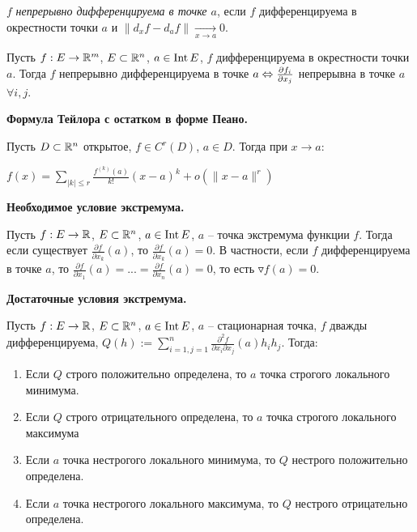 \documentclass[10pt, oneside, dvipsnames]{extarticle}
\begin{document}
\begin{definition}
    $f$ \textit{непрерывно дифференцируема в точке $a$}, если $f$ дифференцируема в окрестности точки $a$ и $\|d_xf-d_af\|\underset{x\rightarrow a}{\rightarrow} 0$.
\end{definition}

\begin{theorem}
    Пусть $f: E\rightarrow \mathbb{R}^m$, $E\subset \mathbb{R}^n$, $a\in \operatorname{Int} E$, $f$ дифференцируема в окрестности точки $a$. Тогда $f$ непрерывно дифференцируема в точке $a\Leftrightarrow\pdv{f_i}{x_j}$ непрерывна в точке $a$ $\forall i, j$. 
\end{theorem}


\begin{theorem}
    \textbf{Формула Тейлора с остатком в форме Пеано.}

    Пусть $D\subset \mathbb{R}^n$ открытое, $f\in C^{r}(D)$, $a\in D$. Тогда при $x\rightarrow a$:
    
    $f(x)=\sum\limits_{|k|\leq r}\frac{f^{(k)}(a)}{k!}(x-a)^k+o(\|x-a\|^r)$
\end{theorem}

\begin{theorem}
    \textbf{Необходимое условие экстремума.}

    Пусть $f: E\rightarrow \mathbb{R}$, $E\subset \mathbb{R}^n$, $a\in \operatorname{Int} E$, $a$ – точка экстремума функции $f$. Тогда если существует $\frac{\partial f}{\partial x_k}(a)$, то $\frac{\partial f}{\partial x_k}(a)=0$. В частности, если $f$ дифференцируема в точке $a$, то $\frac{\partial f}{\partial x_1}(a)=...=\frac{\partial f}{\partial x_n}(a)=0$, то есть $\triangledown f(a)=0$.
\end{theorem}

\begin{theorem}
    \textbf{Достаточные условия экстремума.}

    Пусть $f: E\rightarrow \mathbb{R}$, $E\subset \mathbb{R}^n$, $a\in \operatorname{Int} E$, $a$ – стационарная точка, $f$ дважды дифференцируема, $Q(h):=\sum\limits_{i=1, j=1}^n\frac{\partial^2 f}{\partial x_i \partial x_j}(a) h_i h_j$. Тогда:
    \begin{enumerate}
        \item Если $Q$ строго положительно определена, то $a$ точка строгого локального минимума.
        \item Если $Q$ строго отрицательного определена, то $a$ точка строгого локального максимума
        \item Если $a$ точка нестрогого локального минимума, то $Q$ нестрого положительно определена.
        \item Если $a$ точка нестрогого локального максимума, то $Q$ нестрого отрицательно определена.
    \end{enumerate}
\end{theorem}
\end{document}
